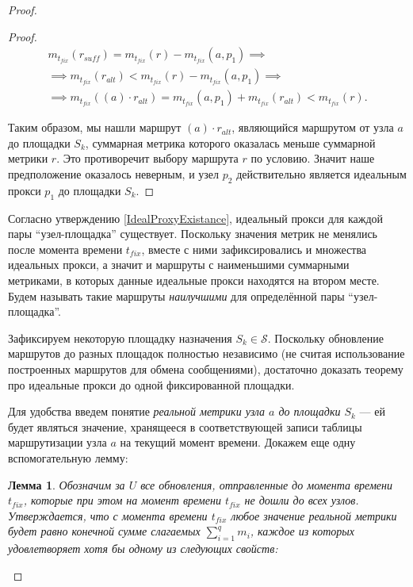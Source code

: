 \documentclass{article}
\theoremstyle{plain}
\theoremstyle{plain}
\theoremstyle{plain}
\newtheorem{lemma}{Лемма}[section]
\theoremstyle{plain}
\theoremstyle{definition}
\theoremstyle{remark}
\theoremstyle{plain}
\begin{document}
\begin{proof}
\begin{proof}
        \begin{equation*}
        \begin{aligned}
            m_{t_{fix}}(r_{suff}) = m_{t_{fix}}(r) - m_{t_{fix}}(a, p_1) \implies \\
            \implies m_{t_{fix}}(r_{alt}) < m_{t_{fix}}(r) - m_{t_{fix}}(a, p_1) \implies \\
            \implies m_{t_{fix}}((a) \cdot r_{alt}) = m_{t_{fix}}(a, p_1) + m_{t_{fix}}(r_{alt}) < m_{t_{fix}}(r).
        \end{aligned}
        \end{equation*}
        
        Таким образом, мы нашли маршрут $(a) \cdot r_{alt}$, являющийся маршрутом от узла $a$ до площадки $S_k$, суммарная метрика которого оказалась меньше суммарной метрики $r$. Это противоречит выбору маршрута $r$ по условию. Значит наше предположение оказалось неверным, и узел $p_2$ действительно является идеальным прокси $p_1$ до площадки $S_k$.
    \end{proof}
    
    Согласно утверждению \ref{IdealProxyExistance}, идеальный прокси для каждой пары \enquote{узел-площадка} существует. Поскольку значения метрик не менялись после момента времени $t_{fix}$, вместе с ними зафиксировались и множества идеальных прокси, а значит и маршруты с наименьшими суммарными метриками, в которых данные идеальные прокси находятся на втором месте. Будем называть такие маршруты \textit{наилучшими} для определённой пары \enquote{узел-площадка}.
    
    Зафиксируем некоторую площадку назначения $S_k \in \mathcal{S}$. Поскольку обновление маршрутов до разных площадок полностью независимо (не считая использование построенных маршрутов для обмена сообщениями), достаточно доказать теорему про идеальные прокси до одной фиксированной площадки.
    
    Для удобства введем понятие \textit{реальной метрики узла $a$ до площадки $S_k$} --- ей будет являться значение, хранящееся в соответствующей записи таблицы маршрутизации узла $a$ на текущий момент времени. Докажем еще одну вспомогательную лемму:
    
    \begin{lemma}
    \label{PossibleMetricValue}
        Обозначим за $U$ все обновления, отправленные до момента времени $t_{fix}$, которые при этом на момент времени $t_{fix}$ не дошли до всех узлов. Утверждается, что с момента времени $t_{fix}$ любое значение реальной метрики будет равно конечной сумме слагаемых $\displaystyle \sum_{i = 1}^q m_i$, каждое из которых удовлетворяет хотя бы одному из следующих свойств:
        

\end{lemma}
\end{proof}
\end{document}
